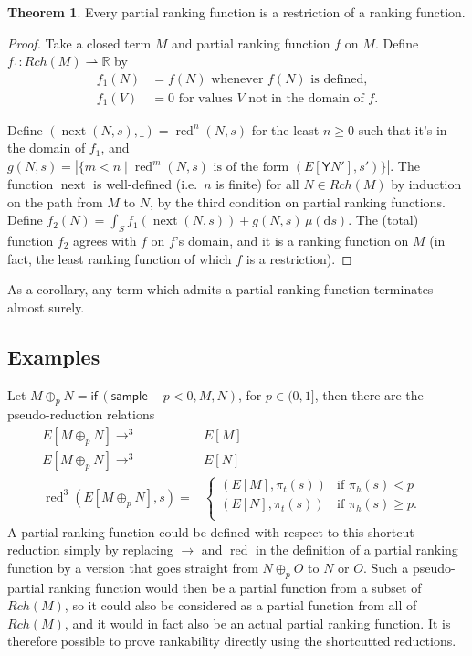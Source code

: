 \documentclass{article}
\newcommand{\tY}{\textsf{Y}}
\newcommand{\tif}[3]{\textsf{if}\,(#1, #2, #3)} %
\newcommand{\tsample}{\textsf{sample}}
\DeclareMathOperator{\red}{red}
\DeclareMathOperator{\nnext}{next}
\theoremstyle{definition}
\theoremstyle{lemma}
\newtheorem{theorem}{Theorem}
\theoremstyle{remark}
\begin{document}
\begin{theorem} \label{partial implies rankable}
Every partial ranking function is a restriction of a ranking function.
\end{theorem}
\begin{proof}
Take a closed term $M$ and partial ranking function $f$ on $M$. Define $f_1 : Rch(M) \rightharpoonup \mathbb R$ by
\begin{align*}
    f_1(N) & = f(N) \text{ whenever $f(N)$ is defined,} \\
    f_1(V) & = 0 \text{ for values $V$ not in the domain of $f$.}
\end{align*}

Define $(\nnext(N,s),\_) = \red^n(N,s)$ for the least $n \geq 0$ such that it's in the domain of $f_1$, and $g(N,s) = \left | \{m < n \mid \red^m(N,s) \text{ is of the form } (E[\tY N'],s') \} \right |$. 
The function $\nnext$ is well-defined (i.e.~$n$ is finite) for all $N \in Rch(M)$ by induction on the path from $M$ to $N$, by the third condition on partial ranking functions. Define $f_2(N) = \int_S f_1(\nnext(N,s)) + g(N,s) \, \mu(\mathrm d s)$. The (total) function $f_2$ agrees with $f$ on $f$'s domain, and it is a ranking function on $M$ (in fact, the least ranking function of which $f$ is a restriction).
\end{proof}


As a corollary, any term which admits a partial ranking function terminates almost surely.

\subsection{Examples}
Let $M \oplus_p N = \tif{\tsample - p < 0} M N$, for $p \in (0,1]$, then there are the pseudo-reduction relations
\begin{align*}
E[M \oplus_p N] \to^3 & E[M] & \\
E[M \oplus_p N] \to^3 & E[N] & \\
\red^3(E[M \oplus_p N], s) = & \left\{
    \begin{array}{ll}
        (E[M],\pi_t(s)) & \text{if } \pi_h(s) < p \\
        (E[N],\pi_t(s)) & \text{if } \pi_h(s) \geq p. \\
    \end{array} \right .
\end{align*}
A partial ranking function could be defined with respect to this shortcut reduction simply by replacing $\to$ and $\red$ in the definition of a partial ranking function by a version that goes straight from $N \oplus_p O$ to $N$ or $O$. Such a pseudo-partial ranking function would then be a partial function from a subset of $Rch(M)$, so it could also be considered as a partial function from all of $Rch(M)$, and it would in fact also be an actual partial ranking function. It is therefore possible to prove rankability directly using the shortcutted reductions.
\end{document}
